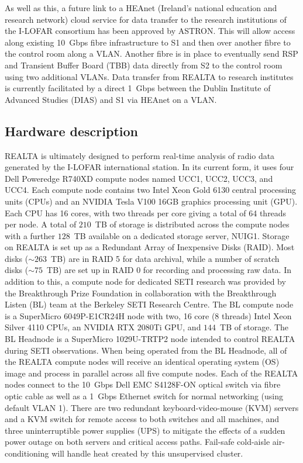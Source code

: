 As well as this, a future link to a HEAnet (Ireland’s national education and research network) cloud service for data transfer to the research institutions of the I-LOFAR consortium has been approved by ASTRON. This will allow access along existing 10~Gbps fibre infrastructure to S1 and then over another fibre to the control room along a VLAN. Another fibre is in place to eventually send RSP and Transient Buffer Board (TBB) data directly from S2 to the control room using two additional VLANs.
Data transfer from REALTA to research institutes is currently facilitated by a direct 1~Gbps between the Dublin Institute of Advanced Studies (DIAS) and S1 via HEAnet on a VLAN.

\subsection{Hardware description}
REALTA is ultimately designed to perform real-time analysis of radio data generated by the I-LOFAR international station. In its current form, it uses four Dell Poweredge R740XD compute nodes named UCC1, UCC2, UCC3, and UCC4. Each compute node contains two Intel Xeon\textsuperscript{\textregistered} Gold 6130 central processing units (CPUs) and an NVIDIA Tesla V100 16GB graphics processing unit (GPU). Each CPU has 16 cores, with two threads per core giving a total of 64 threads per node.  A total of $210$~TB of storage is distributed across the compute nodes with a further $128$~TB available on a dedicated storage server, NUIG1. Storage on REALTA is set up as a Redundant Array of Inexpensive Disks (RAID). Most disks ($\sim 263$~TB) are in RAID 5 for data archival, while a number of scratch disks ($\sim 75$~TB) are set up in RAID 0 for recording and processing raw data. In addition to this, a compute node for dedicated SETI research was provided by the Breakthrough Prize Foundation in collaboration with the Breakthrough Listen (BL) team at the Berkeley SETI Research Centre. The BL compute node is a SuperMicro 6049P-E1CR24H node with two, 16 core (8 threads) Intel Xeon\textsuperscript{\textregistered} Silver 4110 CPUs, an NVIDIA RTX 2080Ti GPU, and $144$~TB of storage. The BL Headnode is a SuperMicro 1029U-TRTP2 node intended to control REALTA during SETI observations. When being operated from the BL Headnode, all of the REALTA compute nodes will receive an identical operating system (OS) image and process in parallel across all five compute nodes. Each of the REALTA nodes connect to the 10~Gbps Dell EMC S4128F-ON optical switch via fibre optic cable as well as a 1~Gbps Ethernet switch for normal networking (using default VLAN 1). There are two redundant keyboard-video-mouse (KVM) servers and a KVM switch for remote access to both switches and all machines, and three uninterruptible power supplies (UPS) to mitigate the effects of a sudden power outage on both servers and critical access paths. Fail-safe cold-aisle air-conditioning will handle heat created by this unsupervised cluster.

